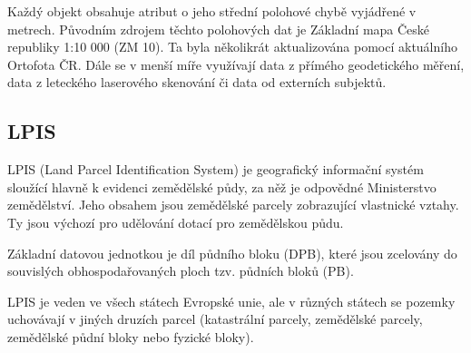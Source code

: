 \documentclass[a4paper,oneside,12pt]{book}
\begin{document}
\hspace{10mm} Každý objekt obsahuje atribut o jeho střední polohové chybě vyjádřené v metrech. Původním zdrojem těchto polohových dat je Základní mapa České republiky 1:10 000 (ZM 10). Ta byla několikrát aktualizována pomocí aktuálního Ortofota ČR. Dále se v menší míře využívají data z přímého geodetického měření, data z leteckého laserového
skenování či data od externích subjektů. \cite{nEFEg7XpI9hVQCiO} 


\subsection{LPIS} \label{lpis}
\hspace{10mm} LPIS (Land Parcel Identification System) je geografický informační systém sloužící hlavně k evidenci zemědělské půdy, za něž je odpovědné Ministerstvo zemědělství. Jeho obsahem jsou zemědělské parcely zobrazující vlastnické vztahy. Ty jsou výchozí pro udělování dotací pro zemědělskou půdu.\cite{Devaty2018}

\hspace{10mm} Základní datovou jednotkou je díl půdního bloku (DPB), které jsou zcelovány do souvislých obhospodařovaných ploch tzv. půdních bloků (PB). \cite{Devaty2018}

\hspace{10mm} LPIS je veden ve všech státech Evropské unie, ale v různých státech se pozemky uchovávají v jiných druzích parcel (katastrální parcely, zemědělské parcely, zemědělské půdní bloky nebo fyzické bloky). \cite{KocurBera2019}
\end{document}
